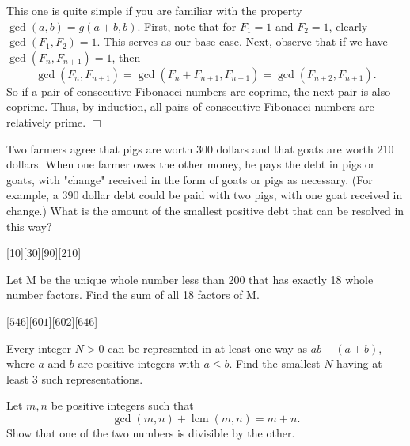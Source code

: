 \begin{solution}
    This one is quite simple if you are familiar with the property \(\gcd(a,b)=g(a+b,b)\). First, note that for \(F_1=1\) and \(F_2=1\), clearly \(\gcd(F_1,F_2)=1\). This serves as our base case. Next, observe that if we have \(\gcd(F_{n}, F_{n+1})=1\), then
    \[
        \gcd(F_n,F_{n+1})= \gcd(F_n+F_{n+1}, F_{n+1}) = \gcd(F_{n+2}, F_{n+1}).
    \]
    So if a pair of consecutive Fibonacci numbers are coprime, the next pair is also coprime. Thus, by induction, all pairs of consecutive Fibonacci numbers are relatively prime. $\Box$
\end{solution}

\begin{problem}[D][3][2006 AMC 12A/14]
    Two farmers agree that pigs are worth $300$ dollars and that goats are worth $210$ dollars. When one farmer owes the other money, he pays the debt in pigs or goats, with "change" received in the form of goats or pigs as necessary. (For example, a $390$ dollar debt could be paid with two pigs, with one goat received in change.) What is the amount of the smallest positive debt that can be resolved in this way?
\end{problem}
[10][30][90][210]

\begin{problem}
    Let M be the unique whole number less than 200 that has exactly 18 whole number factors. Find the sum of all 18 factors of M.
\end{problem}
[$546$][$601$][$602$][$646$]

\begin{problem}[D][6][AMATYC Spring 2016/11]
    Every integer $N > 0$ can be represented in at least one way as $ab - (a + b)$, where $a$ and $b$ are positive integers with $a \leq b$. Find the smallest $N$ having at least 3 such representations.
\end{problem}

\begin{problem}
    Let \( m, n \) be positive integers such that
    \[
    \gcd(m, n) + \operatorname{lcm}(m, n) = m + n.
    \]
    Show that one of the two numbers is divisible by the other.
\end{problem}

